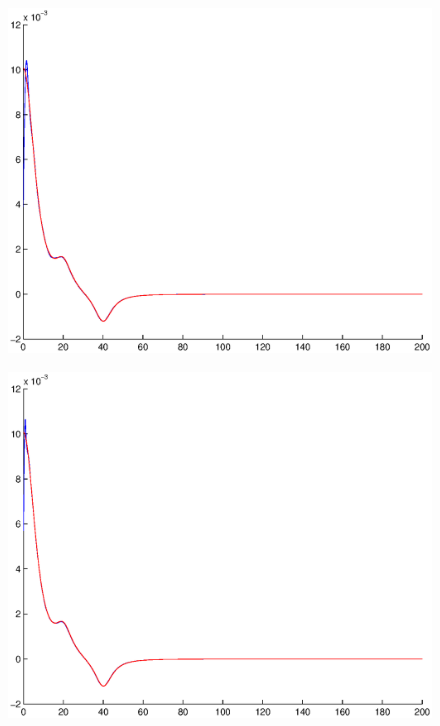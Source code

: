 \documentclass[A4paper,11pt]{article}
\theoremstyle{definition}
\begin{document}
\begin{figure}[H]
\centering
\begin{minipage}{.33\textwidth}
  \centering
  \vspace{0.22cm}
  \includegraphics[scale=0.25]{pictures/Example7/Fig5.eps}
  \label{fig:7_5}
\end{minipage}%
\begin{minipage}{.33\textwidth}
  \centering
  \vspace{0.2cm}
  \includegraphics[scale=0.25]{pictures/Example7/Fig6.eps}
  \label{fig:7_6}
\end{minipage}%

\end{figure}
\end{document}
